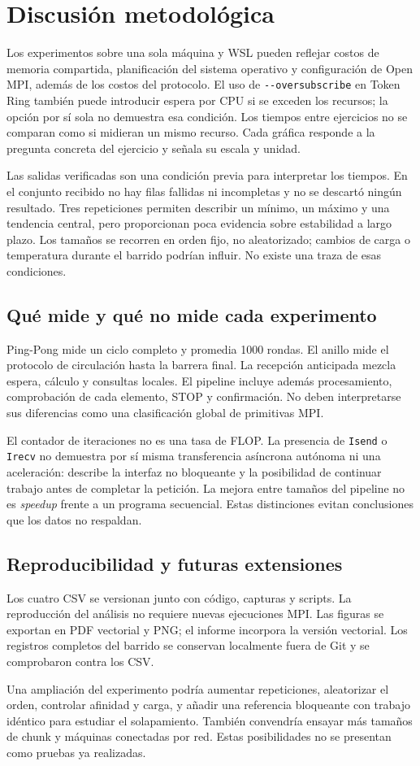 \documentclass[11pt,letterpaper]{article}
\newcommand{\heading}[1]{\section{\textcolor{azul}{#1}}}
\newcommand{\subheading}[1]{\subsection{\textcolor{azul}{#1}}}
\begin{document}
\clearpage
\heading{Discusión metodológica}

Los experimentos sobre una sola máquina y WSL pueden reflejar costos de
memoria compartida, planificación del sistema operativo y configuración
de Open MPI, además de los costos del protocolo. El uso de
\texttt{-{}-oversubscribe} en Token Ring también puede introducir espera
por CPU si se exceden los recursos; la opción por sí sola no demuestra
esa condición. Los tiempos entre ejercicios no se comparan como si
midieran un mismo recurso. Cada gráfica responde a la pregunta concreta
del ejercicio y señala su escala y unidad.

Las salidas verificadas son una condición previa para interpretar los
tiempos. En el conjunto recibido no hay filas fallidas ni incompletas y
no se descartó ningún resultado. Tres repeticiones permiten describir
un mínimo, un máximo y una tendencia central, pero proporcionan poca
evidencia sobre estabilidad a largo plazo. Los tamaños se recorren en
orden fijo, no aleatorizado; cambios de carga o temperatura durante el
barrido podrían influir. No existe una traza de esas condiciones.

\subheading{Qué mide y qué no mide cada experimento}
Ping-Pong mide un ciclo completo y promedia 1000 rondas. El anillo mide
el protocolo de circulación hasta la barrera final. La recepción
anticipada mezcla espera, cálculo y consultas locales. El pipeline
incluye además procesamiento, comprobación de cada elemento, STOP y
confirmación. No deben interpretarse sus diferencias como una
clasificación global de primitivas MPI.

El contador de iteraciones no es una tasa de FLOP. La presencia de
\texttt{Isend} o \texttt{Irecv} no demuestra por sí misma transferencia
asíncrona autónoma ni una aceleración: describe la interfaz no bloqueante
y la posibilidad de continuar trabajo antes de completar la petición.
La mejora entre tamaños del pipeline no es \emph{speedup} frente a un
programa secuencial. Estas distinciones evitan conclusiones que los datos
no respaldan.

\subheading{Reproducibilidad y futuras extensiones}
Los cuatro CSV se versionan junto con código, capturas y scripts. La
reproducción del análisis no requiere nuevas ejecuciones MPI. Las
figuras se exportan en PDF vectorial y PNG; el informe incorpora la
versión vectorial. Los registros completos del barrido se conservan
localmente fuera de Git y se comprobaron contra los CSV.

Una ampliación del experimento podría aumentar repeticiones, aleatorizar
el orden, controlar afinidad y carga, y añadir una referencia bloqueante
con trabajo idéntico para estudiar el solapamiento. También convendría
ensayar más tamaños de chunk y máquinas conectadas por red. Estas
posibilidades no se presentan como pruebas ya realizadas.
\end{document}
